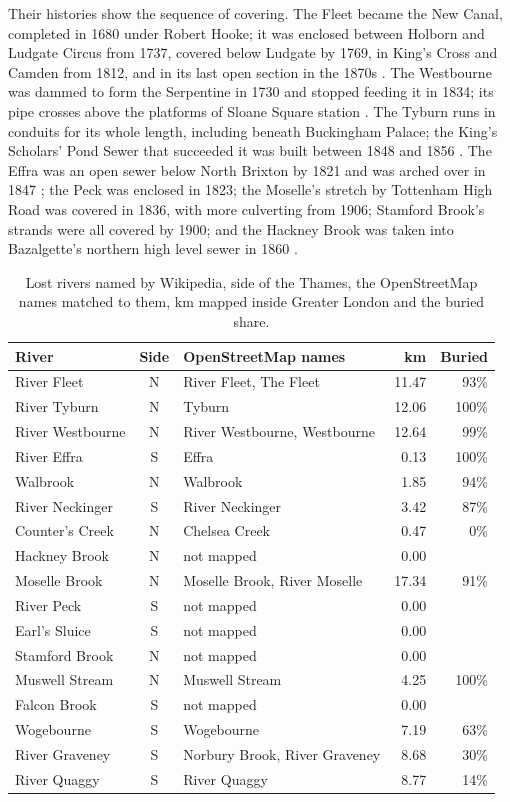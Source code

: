 \documentclass[11pt,a4paper]{article}
\begin{document}
Their histories show the sequence of covering. The Fleet became the New Canal, completed in 1680 under Robert Hooke; it was enclosed between Holborn and Ludgate Circus from 1737, covered below Ludgate by 1769, in King's Cross and Camden from 1812, and in its last open section in the 1870s \citep{wikifleet}. The Westbourne was dammed to form the Serpentine in 1730 and stopped feeding it in 1834; its pipe crosses above the platforms of Sloane Square station \citep{wikiwest}. The Tyburn runs in conduits for its whole length, including beneath Buckingham Palace; the King's Scholars' Pond Sewer that succeeded it was built between 1848 and 1856 \citep{wikityb}. The Effra was an open sewer below North Brixton by 1821 and was arched over in 1847 \citep{wikieffra}; the Peck was enclosed in 1823; the Moselle's stretch by Tottenham High Road was covered in 1836, with more culverting from 1906; Stamford Brook's strands were all covered by 1900; and the Hackney Brook was taken into Bazalgette's northern high level sewer in 1860 \citep{wikirivers}.

\begin{table}[tbp]\centering\footnotesize\caption{Lost rivers named by Wikipedia, side of the Thames, the OpenStreetMap names matched to them, km mapped inside Greater London and the buried share.}\label{tab:lost}\begin{tabular}{lcp{6.2cm}rr}\toprule River & Side & OpenStreetMap names & km & Buried\\\midrule
River Fleet & N & River Fleet, The Fleet & 11.47 & 93\%\\
River Tyburn & N & Tyburn & 12.06 & 100\%\\
River Westbourne & N & River Westbourne, Westbourne & 12.64 & 99\%\\
River Effra & S & Effra & 0.13 & 100\%\\
Walbrook & N & Walbrook & 1.85 & 94\%\\
River Neckinger & S & River Neckinger & 3.42 & 87\%\\
Counter's Creek & N & Chelsea Creek & 0.47 & 0\%\\
Hackney Brook & N & not mapped & 0.00 & \\
Moselle Brook & N & Moselle Brook, River Moselle & 17.34 & 91\%\\
River Peck & S & not mapped & 0.00 & \\
Earl's Sluice & S & not mapped & 0.00 & \\
Stamford Brook & N & not mapped & 0.00 & \\
Muswell Stream & N & Muswell Stream & 4.25 & 100\%\\
Falcon Brook & S & not mapped & 0.00 & \\
Wogebourne & S & Wogebourne & 7.19 & 63\%\\
River Graveney & S & Norbury Brook, River Graveney & 8.68 & 30\%\\
River Quaggy & S & River Quaggy & 8.77 & 14\%\\
\bottomrule\end{tabular}\end{table}
\end{document}
